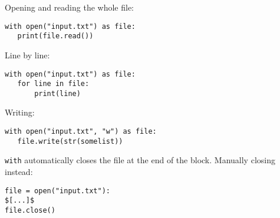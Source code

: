 \documentclass[12pt,twocolumn]{article}
\begin{document}
	Opening and reading the whole file:
	\begin{lstlisting}
with open("input.txt") as file:
   print(file.read())\end{lstlisting}
   
   Line by line:
   \begin{lstlisting}
with open("input.txt") as file:
   for line in file:
       print(line)\end{lstlisting}
       
   Writing:
   \begin{lstlisting}
with open("input.txt", "w") as file:
   file.write(str(somelist))\end{lstlisting}
        
   \lstinline|with| automatically closes the file at the end of the block. Manually closing instead:
   
   \begin{lstlisting}
file = open("input.txt"):
$[...]$
file.close()\end{lstlisting}
\end{document}
